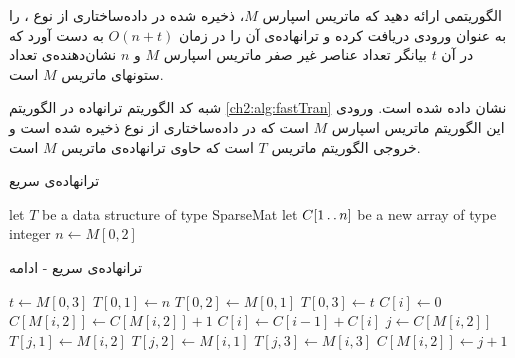 
%

 الگوریتمی ارائه دهید که ماتریس اسپارس {$M$}، ذخیره شده در داده‌ساختاری از نوع {}، را به عنوان ورودی دریافت کرده و ترانهاده‌ی آن را در زمان {$O(n+t)$} به دست آورد که در آن {$t$} بیانگر تعداد عناصر غیر صفر ماتریس اسپارس {$M$} و {$n$} نشان‌دهنده‌ی تعداد ستونهای ماتریس {$M$} است.


شبه کد الگوریتم ترانهاده در الگوریتم {\eqref{ch2:alg:fastTran}} نشان داده شده است. ورودی این الگوریتم ماتریس اسپارس {$M$} است که در داده‌ساختاری از نوع {} ذخیره شده است و خروجی الگوریتم ماتریس {$T$} است که حاوی ترانهاده‌ی ماتریس {$M$} است.

\begin{algorithm}[H]
\caption{ترانهاده‌‌ی سریع}\label{ch2:alg:fastTran}
\begin{latin}
\begin{algorithmic}[1]
		\State	let $T$ be a data structure of type SparseMat
		\State	let $C[1\mathinner{\ldotp\ldotp} n]$ be a new array of type integer
		\State	$n \gets M[0,2]$
\end{algorithmic}
\end{latin}
\end{algorithm}

\begin{algorithm}[t]
\caption*{ترانهاده‌‌ی سریع - ادامه}
\begin{latin}
\begin{algorithmic}[1]
 		\State	$t \gets M[0,3]$		
		\State	$T[0,1] \gets n$		
		\State 	$T[0,2] \gets M[0,1]$
		\State	$T[0,3] \gets t$		
				\State	\Return
		\Else							
						\State	$C[i] \gets 0$
				\EndFor
						\State	$C[M[i,2]] \gets C[M[i,2]]+1$		
				\EndFor	
						\State	$C[i] \gets C[i-1]+C[i]$		
				\EndFor	
						\State	$j \gets C[M[i,2]]$		
						\State	$T[j,1] \gets M[i,2]$
						\State	$T[j,2] \gets M[i,1]$
						\State	$T[j,3] \gets M[i,3]$
						\State	$C[M[i,2]] \gets j+1$
				\EndFor		
		\EndIf
\EndProcedure
\end{algorithmic}
\end{latin}
\end{algorithm}

